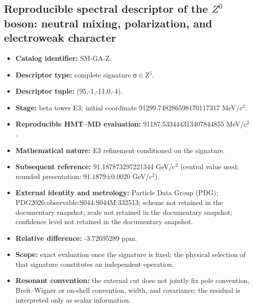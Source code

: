 \subsection{Reproducible spectral descriptor of the \(Z^0\) boson: neutral mixing, polarization, and electroweak character}
\begin{itemize}
\item \textbf{Catalog identifier:} SM-GA-Z.
\item \textbf{Descriptor type:} complete signature σ\(\in\)Z\({}^{5}\).
\item \textbf{Descriptor tuple:} (95,-1,-11,0,-4).
\item \textbf{Stage:} beta tower E3; initial coordinate 91299.748286\allowbreak{}598170\allowbreak{}117317 MeV/c\({}^{2}\).
\item \textbf{Reproducible HMT--MD evaluation:} 91187.533444\allowbreak{}313407\allowbreak{}844855 MeV/c\({}^{2}\).
\item \textbf{Mathematical nature:} E3 refinement conditioned on the signature.
\item \textbf{Subsequent reference:} 91.187873\allowbreak{}297221\allowbreak{}344 GeV/c\({}^{2}\) (central value used; rounded presentation: 91.1879±\allowbreak{}0.0020 GeV/c\({}^{2}\)).
\item \textbf{External identity and metrology:} Particle Data Group (PDG); PDG2026:\allowbreak{}observable:\allowbreak{}S044:\allowbreak{}S044M:\allowbreak{}332513; scheme not retained in the documentary snapshot; scale not retained in the documentary snapshot; confidence level not retained in the documentary snapshot.
\item \textbf{Relative difference:} -3.726952\allowbreak{}89 ppm.
\item \textbf{Scope:} exact evaluation once the signature is fixed; the physical selection of that signature constitutes an independent operation.
\item \textbf{Resonant convention:} the external cut does not jointly fix pole convention, Breit--Wigner or on-shell convention, width, and covariance; the residual is interpreted only as scalar information.
\end{itemize}
